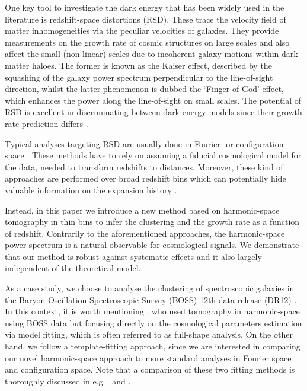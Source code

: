 \documentclass[astrosymb,twocolumn]{aastex631}
\begin{document}
One key tool to investigate the dark energy that has been widely used in the literature is redshift-space distortions (RSD). These trace the velocity field of matter inhomogeneities via the peculiar velocities of galaxies. They provide measurements on the growth rate of cosmic structures on large scales \citep{Kaiser:1987qv} and also affect the small (non-linear) scales due to incoherent galaxy motions within dark matter haloes. The former is known as the Kaiser effect, described by the squashing of the galaxy power spectrum perpendicular to the line-of-sight direction, whilst the latter phenomenon is dubbed the `Finger-of-God' effect, which enhances the power along the line-of-sight on small scales. The potential of RSD is excellent in discriminating between dark energy models since their growth rate prediction differs \citep[e.g.][]{2008Natur.451..541G}.

Typical analyses targeting RSD are usually done in Fourier- \citep{GilMarin2016,Zhao2017} or configuration-space \citep{Chuang2017,pellejeroibanez2016clustering,Wang2017}. These methods have to rely on assuming a fiducial cosmological model for the data, needed to transform redshifts to distances. Moreover, these kind of approaches are performed over broad redshift bins which can potentially hide valuable information on the expansion history \citep[but see e.g.][for a different approach]{2017MNRAS.464.2698R}.

Instead, in this paper we introduce a new method based on harmonic-space tomography in thin bins to infer the clustering and the growth rate as a function of redshift. Contrarily to the aforementioned approaches, the harmonic-space power spectrum is a natural observable for cosmological signals. We demonstrate that our method is robust against systematic effects and it also largely independent of the theoretical model.

As a case study, we choose to analyse the clustering of spectroscopic galaxies in the Baryon Oscillation Spectroscopic Survey (BOSS) 12th data release (DR12) \citep{Alam_2015}. In this context, it is worth mentioning \citet{Loureiro2019}, who used tomography in harmonic-space using BOSS data but focusing directly on the cosmological parameters estimation via model fitting, which is often referred to as full-shape analysis. On the other hand, we follow a template-fitting approach, since we are interested in comparing our novel harmonic-space approach to more standard analyses in Fourier space and configuration space. Note that a comparison of these two fitting methods is thoroughly discussed in e.g.\ \citet{Ivanov2020} and \citet{brieden2021shapefit}.
\end{document}
